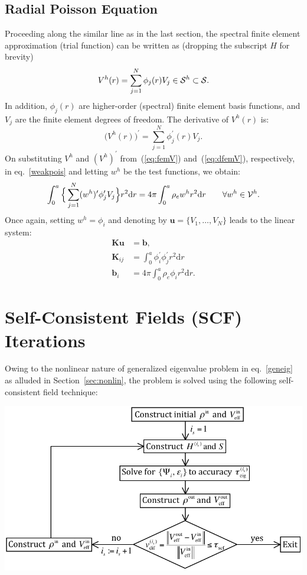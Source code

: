 \documentclass[12pt,dvipsnames]{article}
\newcommand{\eref}[1]{(\ref{#1})}
\newcommand{\vm}[1]{\mathbf{#1}}
\begin{document}
\subsection{Radial Poisson Equation}
Proceeding along the similar line as in the last section, the spectral finite element 
approximation (trial function) can be written as (dropping the subscript $H$ for brevity)
\begin{equation}	\label{eq:femV}
V^h (r) = \sum_{j=1}^N \phi_j(r) V_j \in {\cal S}^h \subset {\cal S}.
\end{equation}
In addition, $\phi_j(r)$ are higher-order (spectral) finite element 
basis functions, and $V_j$ are the finite element degrees of freedom. 
The derivative of $V^h(r)$ is:
\begin{equation}\label{eq:dfemV}
\bigl(V^h(r)\bigr)^\prime = \sum_{j=1}^N \phi_j^\prime (r) V_j.
\end{equation}
On substituting $V^h$ and $(V^h)^\prime$ from~\eref{eq:femV} and~\eref{eq:dfemV}, 
respectively, in eq.~\eqref{weakpois} and letting $w^h$ be the test functions, we obtain:
\begin{equation*}
\int_0^a \Big\{ \sum_{j=1}^N (w^h)^\prime \phi_j^\prime V_j \Big\} r^2 \mathrm{d} r = 4 \pi \int_0^a \rho_e w^h r^2 \mathrm{d} r \qquad \forall w^h \in {\cal V}^h.
\end{equation*}
Once again, setting $w^h = \phi_i$ and denoting by $\vm{u} = \{V_1, \ldots, V_N\}$ leads to the linear system:
\begin{subequations}\label{eq:linsys}
\begin{align}
\vm{K}\vm{u} &= \vm{b}, \\
\vm{K}_{ij} & = \int_0^a \phi_i^\prime \phi_j^\prime r^2 \mathrm{d} r \\
\vm{b}_i & = 4 \pi \int_0^a \rho_e \phi_i r^2 \mathrm{d} r.
\end{align}
\end{subequations}
%
\section{Self-Consistent Fields (SCF) Iterations}
Owing to the nonlinear nature of generalized eigenvalue problem in eq.~\eqref{geneig} as 
alluded in Section~\ref{sec:nonlin}, the problem is solved using the following self-consistent 
field technique:
\begin{center}
\includegraphics[width=1\textwidth]{scf.pdf}
\end{center}
\end{document}

